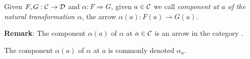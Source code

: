 \begin{defin}\label{Nat:def:natural:component}
    Given $F,G:\mbox{$\cal C$}\to\mbox{$\cal D$}$ and $\alpha:F\Rightarrow G$, given $a\in\mbox{$\cal C$}$
    we call {\em component at $a$ of the natural transformation $\alpha$},
    the arrow $\alpha(a):F(a)\to G(a)$.
\end{defin}

\noindent
{\bf Remark}: The component $\alpha(a)$ of $\alpha$ at $a\in\mbox{$\cal C$}$ is an arrow 
in the category \Dat.

\begin{notation}\label{Nat:notation:natural:component}
    The component $\alpha(a)$ of $\alpha$ at $a$ is commonly denoted $\alpha_{a}$.
\end{notation}


